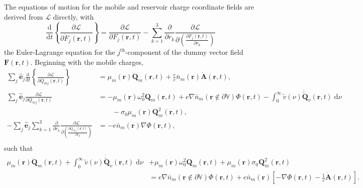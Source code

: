 \documentclass{article}
\begin{document}
The equations of motion for the mobile and reservoir charge coordinate fields are derived from $\mathcal{L}$ directly, with
\begin{equation}
\frac{\mathrm{d}}{\mathrm{d}t}\left\{\frac{\partial \mathcal{L}}{\partial \dot{F}_j(\mathbf{r},t)}\right\} = \frac{\partial \mathcal{L}}{\partial F_j(\mathbf{r},t)} - \sum_{k = 1}^3\frac{\partial}{\partial r_k}\frac{\partial \mathcal{L}}{\partial\!\left(\frac{\partial F_j(\mathbf{r},t)}{\partial r_k}\right)}
\end{equation}
the Euler-Lagrange equation for the $j^\mathrm{th}$-component of the dummy vector field $\mathbf{F}(\mathbf{r},t)$. Beginning with the mobile charges,
\begin{equation}
\begin{split}
\sum_j\hat{\mathbf{e}}_j\frac{\mathrm{d}}{\mathrm{d}t}\left\{\frac{\partial \mathcal{L}}{\partial \dot{Q}_{mj}(\mathbf{r},t)}\right\} &= \mu_m(\mathbf{r})\ddot{\mathbf{Q}}_m(\mathbf{r},t) + \frac{e}{c}\bar{n}_m(\mathbf{r})\dot{\mathbf{A}}(\mathbf{r},t),\\
\sum_j\hat{\mathbf{e}}_j\frac{\partial \mathcal{L}}{\partial Q_{mj}(\mathbf{r},t)} &= -\mu_m(\mathbf{r})\omega_0^2\mathbf{Q}_m(\mathbf{r},t) + e\nabla\bar{n}_m(\mathbf{r}\notin\partial\mathbb{V})\Phi(\mathbf{r},t) - \int_0^\infty\tilde{v}(\nu)\dot{\tilde{\mathbf{Q}}}_\nu(\mathbf{r},t)\;\mathrm{d}\nu\\
&\qquad - \sigma_0\mu_m(\mathbf{r})\mathbf{Q}_m^2(\mathbf{r},t),\\
-\sum_j\hat{\mathbf{e}}_j\sum_{k = 1}^3\frac{\partial}{\partial r_k}\frac{\partial \mathcal{L}}{\partial\!\left(\frac{\partial Q_{mj}(\mathbf{r},t)}{\partial r_k}\right)} &= -e\bar{n}_m(\mathbf{r})\nabla\Phi(\mathbf{r},t),\\
\end{split}
\end{equation}
such that
\begin{equation}\label{eq:eqOfMotionQm}
\begin{split}
\mu_m(\mathbf{r})\ddot{\mathbf{Q}}_m(\mathbf{r},t) + \int_0^\infty\tilde{v}(\nu)\dot{\tilde{\mathbf{Q}}}_\nu(\mathbf{r},t)\;\mathrm{d}\nu &+ \mu_m(\mathbf{r})\omega_0^2\mathbf{Q}_m(\mathbf{r},t) + \mu_m(\mathbf{r})\sigma_0\mathbf{Q}_m^2(\mathbf{r},t)\\
&= e\nabla\bar{n}_m(\mathbf{r}\notin\partial\mathbb{V})\Phi(\mathbf{r},t) + e\bar{n}_m(\mathbf{r})\left[-\nabla\Phi(\mathbf{r},t) - \frac{1}{c}\dot{\mathbf{A}}(\mathbf{r},t)\right].
\end{split}
\end{equation}
\end{document}
